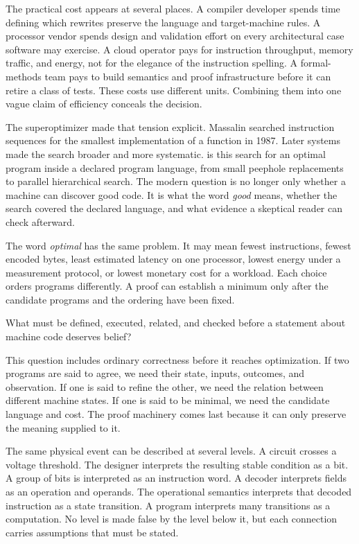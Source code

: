 The practical cost appears at several places. A compiler developer spends
time defining which rewrites preserve the language and target-machine rules.
A processor vendor spends design and validation effort on every architectural
case software may exercise. A cloud operator pays for instruction throughput,
memory traffic, and energy, not for the elegance of the instruction spelling.
A formal-methods team pays to build semantics and proof infrastructure before
it can retire a class of tests. These costs use different units. Combining
them into one vague claim of efficiency conceals the decision.

The superoptimizer made that tension explicit. Massalin searched instruction
sequences for the smallest implementation of a function in 1987.
\autocite{massalin1987} Later systems made the search broader and more
systematic.  is this search for an optimal program
inside a declared program language, from small peephole replacements to
parallel hierarchical search.
\autocite{bansalaiken2006,lubodik2025} The modern question is no longer only
whether a machine can discover good code. It is what the word \emph{good}
means, whether the search covered the declared language, and what evidence a
skeptical reader can check afterward.

The word \emph{optimal} has the same problem. It may mean fewest instructions,
fewest encoded bytes, least estimated latency on one processor, lowest energy
under a measurement protocol, or lowest monetary cost for a workload. Each
choice orders programs differently. A proof can establish a minimum only
after the candidate programs and the ordering have been fixed.

\begin{keyidea}[title={The book's central question}]
What must be defined, executed, related, and checked before a statement about
machine code deserves belief?
\end{keyidea}

This question includes ordinary correctness before it reaches optimization.
If two programs are said to agree, we need their state, inputs, outcomes, and
observation. If one is said to refine the other, we need the relation between
different machine states. If one is said to be minimal, we need the candidate
language and cost. The proof machinery comes last because it can only preserve
the meaning supplied to it.

\begin{goingdeeper}[title={\iconGoingDeeper\ A stack of interpretations}]
The same physical event can be described at several levels. A circuit crosses
a voltage threshold. The designer interprets the resulting stable condition
as a bit. A group of bits is interpreted as an instruction word. A decoder
interprets fields as an operation and operands. The operational semantics
interprets that decoded instruction as a state transition. A program
interprets many transitions as a computation. No level is made false by the
level below it, but each connection carries assumptions that must be stated.
\end{goingdeeper}

